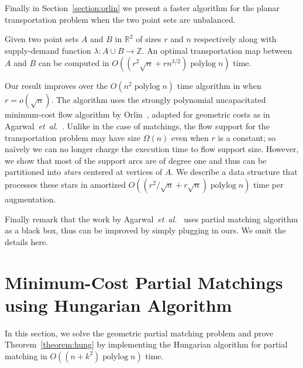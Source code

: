 \documentclass[a4paper,UKenglish]{socg-lipics-v2018}
\def\etal{\emph{et~al.}}
\def\etal{\textit{et~al.}}
\def\polylog{\mathop{\mathrm{polylog}}}
\def\reals{\mathbb{R}}
\def\ints{\mathbb{Z}}
\def\tsupply{\lambda}
\theoremstyle{plain}
\numberwithin{figure}{section}
\begin{document}
\medskip

Finally in Section~\ref{section:orlin} we present a faster algorithm for the
planar transportation problem when the two point sets are unbalanced.

\begin{theorem}
\label{theorem:orlin}
Given two point sets $A$ and $B$ in $\reals^2$ of sizes $r$ and $n$ respectively
along with supply-demand function $\tsupply:A \cup B \to \ints$.
An optimal transportation map between $A$ and $B$ can be computed in
$O((r^2\sqrt{n} + rn^{3/2})\polylog n)$ time.
\end{theorem}

Our result improves over the $O(n^2\polylog n)$ time algorithm in
\cite{AFPVX17} when $r = o(\sqrt{n})$.
The algorithm uses the strongly polynomial uncapacitated minimum-cost
flow algorithm by Orlin~\cite{O93}, adapted for geometric costs as in
Agarwal~\etal~\cite{AFPVX17}.
Unlike in the case of matchings, the flow support for the transportation problem may have size $\Omega(n)$
even when $r$ is a constant; so na\"ively we can no longer charge the execution time to flow support size.
However, we show that most of the support arcs are of degree one and thus can be partitioned
into \emph{stars} centered at vertices of $A$.
We describe a data structure that processes these stars in amortized
$O((r^2/\sqrt{n} + r\sqrt{n})\polylog n)$ time per augmentation.

Finally remark that the work by Agarwal~\etal~\cite{AKKMRSX18} uses partial matching
algorithm as a black box, thus can be improved by simply plugging in ours.
We omit the details here.

\section{Minimum-Cost Partial Matchings using Hungarian Algorithm}
\label{section:hung}

In this section, we solve the geometric partial matching problem and prove Theorem~\ref{theorem:hung} by implementing the Hungarian algorithm for partial matching in $O((n + k^2)\polylog n)$ time.
\end{document}
